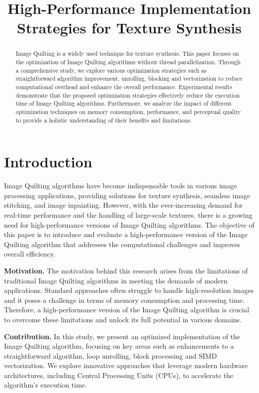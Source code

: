 \documentclass[letterpaper]{article}
\title{High-Performance Implementation Strategies for Texture Synthesis}
\newcommand{\mypar}[1]{{\bf #1.}}
\begin{document}
\pagestyle{plain}

%
\maketitle
%

\begin{abstract}
Image Quilting is a widely used technique for texture synthesis. This paper focuses on the optimization of Image Quilting algorithms without thread parallelization.
Through a comprehensive study, we explore various optimization strategies such as straightforward algorithm improvement, unrolling, blocking and vectorization to reduce computational overhead and enhance the overall performance.
Experimental results demonstrate that the proposed optimization strategies effectively reduce the execution time of Image Quilting algorithms. Furthermore, we analyze the impact of different optimization techniques on memory consumption, performance, and perceptual quality to provide a holistic understanding of their benefits and limitations.
\end{abstract}

\section{Introduction}\label{sec:intro}

Image Quilting algorithms have become indispensable tools in various image processing applications, providing solutions for texture synthesis, seamless image stitching, and image inpainting. However, with the ever-increasing demand for real-time performance and the handling of large-scale textures, there is a growing need for high-performance versions of Image Quilting algorithms. The objective of this paper is to introduce and evaluate a high-performance version of the Image Quilting algorithm that addresses the computational challenges and improves overall efficiency. 

\mypar{Motivation} The motivation behind this research arises from the limitations of traditional Image Quilting algorithms in meeting the demands of modern applications. Standard approaches often struggle to handle high-resolution images and it poses a challenge in terms of memory consumption and processing time. Therefore, a high-performance version of the Image Quilting algorithm is crucial to overcome these limitations and unlock its full potential in various domains.

\mypar{Contribution}
In this study, we present an optimized implementation of the Image Quilting algorithm, focusing on key areas such as enhancements to a straightforward algorithm, loop unrolling, block processing and SIMD vectorization. We explore innovative approaches that leverage modern hardware architectures, including Central Processing Units (CPUs), to accelerate the algorithm's execution time.
\end{document}
